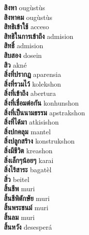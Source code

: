 \textbf{ สิงหา  } ougùstùs \\
\textbf{ สิงหาคม  } ougùstùs \\
\textbf{ สิทธิเข้าใช้  } acceso \\
\textbf{ สิทธิในการเข้าถึง  } admision \\
\textbf{ สิทธิ์  } admision \\
\textbf{ สิบสอง  } dosein \\
\textbf{ สิว  } akné \\
\textbf{ สิ่งที่ปรากฏ  } aparensia \\
\textbf{ สิ่งที่รวมไว้  } kolekshon \\
\textbf{ สิ่งที่เข้าถึง  } abertura \\
\textbf{ สิ่งที่เชื่อมต่อกัน  } konhunshon \\
\textbf{ สิ่งที่เป็นนามธรรม  } apstrakshon \\
\textbf{ สิ่งที่ได้มา  } atkisishon \\
\textbf{ สิ่งปกคลุม  } mantel \\
\textbf{ สิ่งปลูกสร้าง  } konstrukshon \\
\textbf{ สิ่งมีชีวิต  } kreashon \\
\textbf{ สิ่งเล็กๆน้อยๆ  } karai \\
\textbf{ สิ่งไร้สาระ  } bagatèl \\
\textbf{ สิ่ว  } beitel \\
\textbf{ สิ้นชีพ  } muri \\
\textbf{ สิ้นชีพิตักษัย  } muri \\
\textbf{ สิ้นพระชนม์  } muri \\
\textbf{ สิ้นลม  } muri \\
\textbf{ สิ้นหวัง  } desesperá \\
